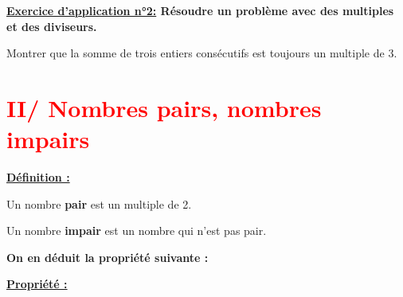 \documentclass[12pt]{article}
\begin{document}
\begin{mdframed}[
    linewidth=1pt,
    roundcorner=5pt,
    linecolor=RoyalBlue,
    innertopmargin=10pt,
    innerbottommargin=10pt
]
{\color{RoyalBlue}
\textbf{\underline{Exercice d'application n°2:} Résoudre un problème avec des multiples et des diviseurs.}}

\vspace{5pt}
Montrer que la somme de trois entiers consécutifs est toujours un multiple de 3.

\vspace{0.5cm}
{\color{black!45}\dotfill}

\vspace{0.5cm}
{\color{black!45}\dotfill}

\vspace{0.5cm}
{\color{black!45}\dotfill}

\vspace{20pt}

\end{mdframed}


\vspace{10pt}
\section*{\textcolor{red}{II/ Nombres pairs, nombres impairs}}

\begin{mdframed}[
    linewidth=1pt,
    roundcorner=5pt,
    linecolor=ForestGreen,
    innertopmargin=10pt,
    innerbottommargin=10pt
]
{\color{ForestGreen}
\textbf{\underline{Définition :}}}

\vspace{5pt}
Un nombre \textbf{pair} est un multiple de 2.

\vspace{5pt}
Un nombre \textbf{impair} est un nombre qui n'est pas pair.

\end{mdframed}

\vspace{5pt}
\textbf{On en déduit la propriété suivante :}

\begin{mdframed}[
    linewidth=1pt,
    roundcorner=5pt,
    linecolor=Red,
    innertopmargin=10pt,
    innerbottommargin=10pt
]
{\color{red}
\textbf{\underline{Propriété :}}

\vspace{0.5cm}
{\color{black!45}\dotfill}

\vspace{0.5cm}
{\color{black!45}\dotfill}

\vspace{20pt}

}
\end{mdframed}
\end{document}
